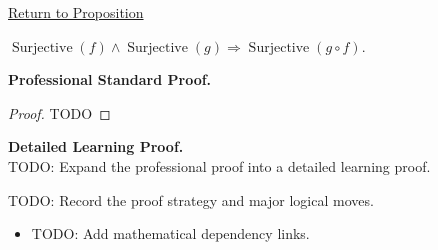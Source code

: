 \newpage
{}
\label{prf:composition-surjective}

\begin{remark*}[Return]
\hyperref[prop:composition-surjective]{Return to Proposition}
\end{remark*}

\begin{proposition*}
$\operatorname{Surjective}(f)\wedge\operatorname{Surjective}(g) \Rightarrow\operatorname{Surjective}(g\circ f)$.
\end{proposition*}

\textbf{Professional Standard Proof.}~\\
\begin{proof}
TODO
\end{proof}

\textbf{Detailed Learning Proof.}~\\
TODO: Expand the professional proof into a detailed learning proof.

\begin{remark*}
TODO: Record the proof strategy and major logical moves.
\end{remark*}

\begin{dependencies}
\begin{itemize}
  \item TODO: Add mathematical dependency links.
\end{itemize}
\end{dependencies}
